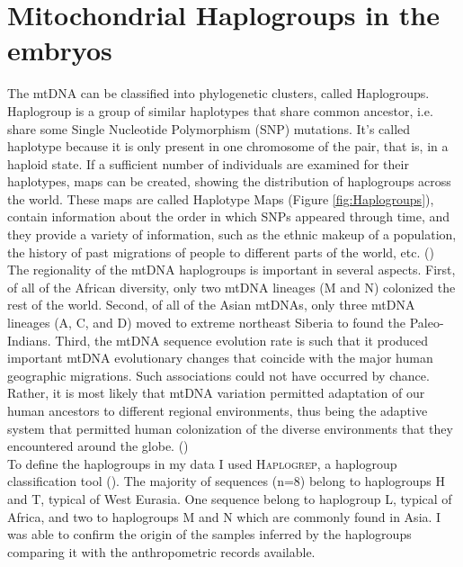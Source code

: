 \section{Mitochondrial Haplogroups in the embryos }
The mtDNA can be classified into phylogenetic clusters, called Haplogroups.
Haplogroup is a group of similar haplotypes that share common ancestor, i.e. share some Single Nucleotide Polymorphism (SNP) mutations. It's called haplotype because it is only present in one chromosome of the pair, that is, in a haploid state. If a sufficient number of individuals are examined for their haplotypes, maps can be created, showing the distribution of haplogroups across the world. These maps are called Haplotype Maps (Figure \ref{fig:Haplogroups}), contain information about the order in which SNPs appeared through time, and they provide a variety of information, such as the ethnic makeup of a population, the history of past migrations of people to different parts of the world, etc. (\cite{arora2015hgsdb})\\
The regionality of the mtDNA haplogroups is important in several aspects. First, of all of the African diversity, only two mtDNA lineages (M and N) colonized the rest of the world. Second, of all of the Asian mtDNAs, only three mtDNA lineages (A, C, and D) moved to extreme northeast Siberia to found the Paleo-Indians. Third, the mtDNA sequence evolution rate is such that it produced important mtDNA evolutionary changes that coincide with the major human geographic migrations. Such associations could not have occurred by chance. Rather, it is most likely that mtDNA variation permitted adaptation of our human ancestors to different regional environments, thus being the adaptive system that permitted human colonization of the diverse environments that they encountered around the globe. (\cite{wallace2013mitochondrial})\\
To define the haplogroups in my data I used \textsc{Haplogrep}, a haplogroup classification tool (\cite{weissensteiner2016haplogrep}). The majority of sequences (n=8) belong to haplogroups H and T, typical of West Eurasia. One sequence belong to haplogroup L, typical of Africa, and two to haplogroups M and N which are commonly found in Asia. I was able to confirm the origin of the samples inferred by the haplogroups comparing it with the anthropometric records available.   



